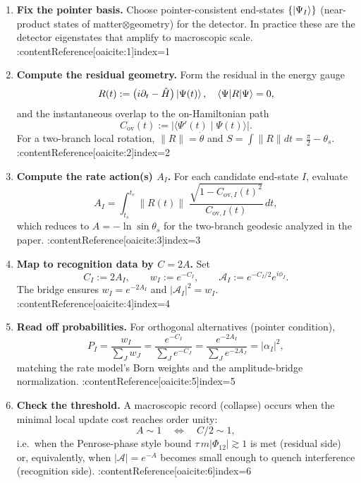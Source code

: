 \documentclass[11pt,letterpaper]{article}
\begin{document}
\begin{enumerate}
\item \textbf{Fix the pointer basis.}  
Choose pointer-consistent end-states \(\{\ket{\Psi_I}\}\) (near-product states of matter\(\otimes\)geometry) for the detector. In practice these are the detector eigenstates that amplify to macroscopic scale. :contentReference[oaicite:1]{index=1}

\item \textbf{Compute the residual geometry.}  
Form the residual in the energy gauge
\[
R(t):=\bigl(i\partial_t-\hat H\bigr)\ket{\Psi(t)},\quad \langle\Psi|R|\Psi\rangle=0,
\]
and the instantaneous overlap to the on-Hamiltonian path
\[
C_{\mathrm{ov}}(t):=\bigl|\langle\Psi'(t)\mid\Psi(t)\rangle\bigr|.
\]
For a two-branch local rotation, \(\|R\|=\dot\theta\) and \(S=\int\|R\|dt=\tfrac{\pi}{2}-\theta_s\). :contentReference[oaicite:2]{index=2}

\item \textbf{Compute the rate action(s) \(A_I\).}  
For each candidate end-state \(I\), evaluate
\[
A_I=\int_{t_s}^{t_e}\!\|R(t)\|\;\frac{\sqrt{1-C_{\mathrm{ov},I}(t)^2}}{C_{\mathrm{ov},I}(t)}\,dt,
\]
which reduces to \(A=-\ln\sin\theta_s\) for the two-branch geodesic analyzed in the paper. :contentReference[oaicite:3]{index=3}

\item \textbf{Map to recognition data by \(C=2A\).}  
Set
\[
C_I:=2A_I,\qquad
w_I:=e^{-C_I},\qquad
\mathcal A_I:=e^{-C_I/2}e^{i\phi_I}.
\]
The bridge ensures \(w_I=e^{-2A_I}\) and \(|\mathcal A_I|^2=w_I\). :contentReference[oaicite:4]{index=4}

\item \textbf{Read off probabilities.}  
For orthogonal alternatives (pointer condition),
\[
P_I=\frac{w_I}{\sum_J w_J}
=\frac{e^{-C_I}}{\sum_J e^{-C_J}}
=\frac{e^{-2A_I}}{\sum_J e^{-2A_J}}
=|\alpha_I|^2,
\]
matching the rate model’s Born weights and the amplitude-bridge normalization. :contentReference[oaicite:5]{index=5}

\item \textbf{Check the threshold.}  
A macroscopic record (collapse) occurs when the minimal local update cost reaches order unity:
\[
A\sim 1 \quad\Longleftrightarrow\quad C/2\sim 1,
\]
i.e.\ when the Penrose-phase style bound \(\tau\,m|\Phi_{12}|\gtrsim 1\) is met (residual side) or, equivalently, when \(|\mathcal A|=e^{-A}\) becomes small enough to quench interference (recognition side). :contentReference[oaicite:6]{index=6}
\end{enumerate}
\end{document}
